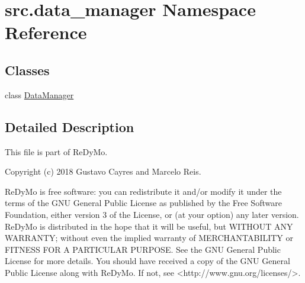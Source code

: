 \hypertarget{namespacesrc_1_1data__manager}{}\section{src.\+data\+\_\+manager Namespace Reference}
\label{namespacesrc_1_1data__manager}
\subsection*{Classes}
\begin{DoxyCompactItemize}
\item 
class \mbox{\hyperlink{classsrc_1_1data__manager_1_1DataManager}{Data\+Manager}}
\end{DoxyCompactItemize}


\subsection{Detailed Description}
\begin{DoxyVerb}This file is part of ReDyMo.

    Copyright (c) 2018  Gustavo Cayres and Marcelo Reis.

    ReDyMo is free software: you can redistribute it and/or modify it
    under the terms of the GNU General Public License as published by the
    Free Software Foundation, either version 3 of the License, or (at your
    option) any later version.
    ReDyMo is distributed in the hope that it will be useful, but WITHOUT
    ANY WARRANTY; without even the implied warranty of MERCHANTABILITY or
    FITNESS FOR A PARTICULAR PURPOSE. See the GNU General Public License
    for more details.
    You should have received a copy of the GNU General Public License along
    with ReDyMo. If not, see <http://www.gnu.org/licenses/>.\end{DoxyVerb}
 